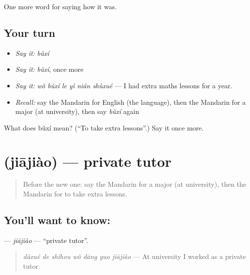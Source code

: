 \begin{grammarlens}[title={What you've built}]
One more word for saying how it was.
\end{grammarlens}

\subsection*{Your turn}
\begin{itemize}
\raggedright
  \item \emph{Say it:} \emph{bǔxí}
  \item \emph{Say it:} \emph{bǔxí}, once more
  \item \emph{Say it:} \emph{wǒ bǔxí le yì nián shùxué} — I had extra maths lessons for a year.
  \item \emph{Recall:} say the Mandarin for English (the language), then the Mandarin for a major (at university), then say \emph{bǔxí} again
\end{itemize}

\begin{tcolorbox}[breakable,colback=teal!4,colframe=teal!35!black,title={Before you move on}]
What does bǔxí mean? (\textquotedblleft{}To take extra lessons\textquotedblright{}.) Say it once more.
\end{tcolorbox}
\section[\texorpdfstring{\zh{家教} (jiājiào)}{家教 (jiājiào)}]{ (jiājiào) — private tutor}

\label{lesson:ZH-C493-jiajiao}



\begin{quote}
Before the new one: say the Mandarin for a major (at university), then the Mandarin for to take extra lessons.
\end{quote}

\subsection*{You'll want to know: }
\textbf{} — \emph{jiājiào} — \textquotedblleft{}private tutor\textquotedblright{}.

\begin{quote}
\textbf{} \emph{dàxué de shíhou wǒ dāng guo jiājiào} — At university I worked as a private tutor.
\end{quote}

